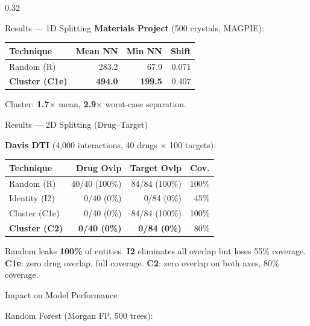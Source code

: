 \documentclass[final]{beamer}
\begin{document}
\begin{frame}[t]
\begin{columns}[T]
\begin{column}{0.32\textwidth}
\begin{block}{Results --- 1D Splitting}
\vspace{1ex}
\textbf{Materials Project} (500 crystals, MAGPIE):

\vspace{0.3ex}
{\small
\begin{tabular}{@{} l r r r @{}}
\toprule
\textbf{Technique} & \textbf{Mean NN} & \textbf{Min NN} & \textbf{Shift} \\
\midrule
\color{palmred}Random (R) & 283.2 & 67.9 & 0.071 \\
\color{palmgreen}\textbf{Cluster (C1e)} & \textbf{494.0} & \textbf{199.5} & 0.407 \\
\bottomrule
\end{tabular}
}

\vspace{0.5ex}
Cluster: \textbf{1.7$\times$} mean, \textbf{2.9$\times$} worst-case separation.
\end{block}

\begin{block}{Results --- 2D Splitting (Drug--Target)}

\textbf{Davis DTI} (4,000 interactions, 40 drugs $\times$ 100 targets):

\vspace{0.3ex}
{\small
\renewcommand{\arraystretch}{1.4}
\begin{tabular}{@{} l r r r @{}}
\toprule
\textbf{Technique} & \textbf{Drug Ovlp} & \textbf{Target Ovlp} & \textbf{Cov.} \\
\midrule
\color{palmred}Random (R) & 40/40 (100\%) & 84/84 (100\%) & 100\% \\
\color{palmorange}Identity (I2) & 0/40 (0\%) & 0/84 (0\%) & 45\% \\
\color{palmgreen}Cluster (C1e) & 0/40 (0\%) & 84/84 (100\%) & 100\% \\
\color{palmgreen}\textbf{Cluster (C2)} & \textbf{0/40 (0\%)} & \textbf{0/84 (0\%)} & 80\% \\
\bottomrule
\end{tabular}
}

\vspace{0.5ex}
Random leaks \textbf{100\%} of entities. \textbf{I2} eliminates all overlap but loses 55\% coverage. \textbf{C1e}: zero drug overlap, full coverage. \textbf{C2}: zero overlap on both axes, 80\% coverage.
\end{block}

\begin{block}{Impact on Model Performance}

Random Forest (Morgan FP, 500 trees):


\end{block}
\end{column}
\end{columns}
\end{frame}
\end{document}
